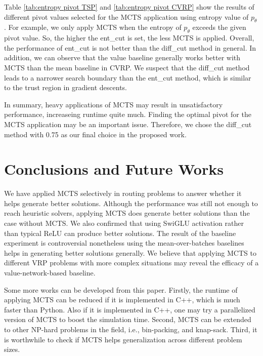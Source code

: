 \documentclass{article}
\begin{document}
Table \ref{tab:entropy pivot TSP} and \ref{tab:entropy pivot CVRP} show the results of different pivot values selected for the MCTS application using entropy value of $p_\theta$. For example, we only apply MCTS when the entropy of $p_\theta$ exceeds the given pivot value. So, the higher the ent\_cut is set, the less MCTS is applied. Overall, the performance of ent\_cut is not better than the diff\_cut method in general. In addition, we can observe that the value baseline generally works better with MCTS than the mean baseline in CVRP. We suspect that the diff\_cut method leads to a narrower search boundary than the ent\_cut method, which is similar to the trust region in gradient descents.

In summary, heavy applications of MCTS may result in unsatisfactory performance, increaseing runtime quite much. Finding the optimal pivot for the MCTS application may be an important issue. Therefore, we chose the diff\_cut method with 0.75 as our final choice in the proposed work.

\section{Conclusions and Future Works}{
    We have applied MCTS selectively in routing problems to answer whether it helps generate better solutions. Although the performance was still not enough to reach heuristic solvers, applying MCTS does generate better solutions than the case without MCTS. We also confirmed that using SwiGLU activation rather than typical ReLU can produce better solutions. The result of the baseline experiment is controversial nonetheless using the mean-over-batches baselines helps in generating better solutions generally. We believe that applying MCTS to different VRP problems with more complex situations may reveal the efficacy of a value-network-based baseline.

    Some more works can be developed from this paper. Firstly, the runtime of applying MCTS can be reduced if it is implemented in C++, which is much faster than Python. Also if it is implemented in C++, one may try a parallelized version of MCTS \cite{parallel_MCTS} to boost the simulation time. Second, MCTS can be extended to other NP-hard problems in the field, i.e., bin-packing, and knap-sack. Third, it is worthwhile to check if MCTS helps generalization across different problem sizes.
}






\medskip

\small






\
\end{document}
